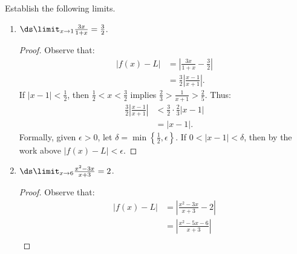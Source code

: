 \documentclass[11pt,twoside,openany]{memoir}
\begin{document}
    \begin{exercise}
        Establish the following limits.
            \begin{enumerate}[label = (\alph*)]
                \item $\ds \limit_{x \rightarrow 1} \frac{3x}{1+x} = \frac{3}{2}$.
                    \begin{proof}
                        Observe that:
                            \begin{equation*}
                            \begin{split}
                                |f(x) - L|
                                & = \left|\frac{3x}{1+x} - \frac{3}{2}\right| \\
                                & = \frac{3}{2} \left|\frac{x-1}{x+1}\right|.
                            \end{split}
                            \end{equation*}
                        If $|x-1| < \frac{1}{2}$, then $\frac{1}{2} < x < \frac{3}{2}$ implies $\frac{2}{3} > \frac{1}{x+1} > \frac{2}{5}$. Thus:
                            \begin{equation*}
                            \begin{split}
                                \frac{3}{2} \left|\frac{x-1}{x+1}\right| 
                                & < \frac{3}{2} \cdot \frac{2}{3} |x-1| \\
                                & = |x-1|.
                            \end{split}
                            \end{equation*}
                        Formally, given $\epsilon > 0$, let $\delta = \min \left\{\frac{1}{2}, \epsilon\right\}$. If $0 < |x-1| < \delta$, then by the work above $|f(x) - L| < \epsilon$.
                    \end{proof}
                \item $\ds \limit_{x \rightarrow 6} \frac{x^2 -3x}{x+3} = 2$.
                    \begin{proof}
                        Observe that:
                            \begin{equation*}
                            \begin{split}
                                |f(x) - L|
                                & = \left|\frac{x^2 - 3x}{x+3} - 2\right| \\
                                & = \left|\frac{x^2 - 5x-6}{x+3}\right| \\

\end{split}
\end{equation*}
\end{proof}
\end{enumerate}
\end{exercise}
\end{document}

